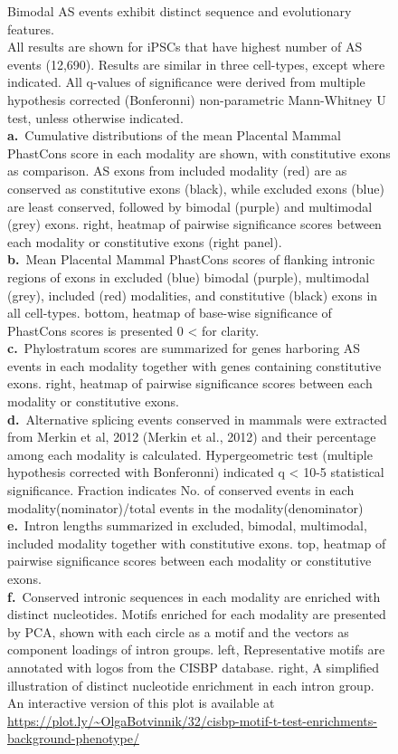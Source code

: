 \clearpage
\thispagestyle{facingcaption}
\begin{figure}[h]
\captionsetup{labelformat=prev-page}
\caption[Bimodal AS events exhibit distinct sequence and evolutionary features.]{
Bimodal AS events exhibit distinct sequence and evolutionary features.\\
All results are shown for iPSCs that have highest number of AS events (12,690). Results are similar in three cell-types, except where indicated. All q-values of significance were derived from multiple hypothesis corrected (Bonferonni) non-parametric Mann-Whitney U test, unless otherwise indicated.\\
\textbf{a.}~Cumulative distributions of the mean Placental Mammal PhastCons score in each modality are shown, with constitutive exons as comparison. AS exons from included modality (red) are as conserved as constitutive exons (black), while excluded exons (blue) are least conserved, followed by bimodal (purple) and multimodal (grey) exons. right, heatmap of pairwise significance scores between each modality or constitutive exons (right panel).\\
\textbf{b.}~Mean Placental Mammal PhastCons scores of flanking intronic regions of exons in excluded (blue) bimodal (purple), multimodal (grey), included (red) modalities, and constitutive (black) exons in all cell-types. bottom, heatmap of base-wise significance of PhastCons scores is presented 0 <  for clarity.\\
\textbf{c.}~Phylostratum scores are summarized for genes harboring AS events in each modality together with genes containing constitutive exons. right, heatmap of pairwise significance scores between each modality or constitutive exons.\\
\textbf{d.}~Alternative splicing events conserved in mammals were extracted from Merkin et al, 2012 (Merkin et al., 2012) and their percentage among each modality is calculated. Hypergeometric test (multiple hypothesis corrected with Bonferonni) indicated q < 10-5 statistical significance. Fraction indicates No. of conserved events in each modality(nominator)/total events in the modality(denominator)\\
\textbf{e.}~Intron lengths summarized in excluded, bimodal, multimodal, included modality together with constitutive exons. top, heatmap of pairwise significance scores between each modality or constitutive exons.\\
\textbf{f.}~Conserved intronic sequences in each modality are enriched with distinct nucleotides. Motifs enriched for each modality are presented by PCA, shown with each circle as a motif and the vectors as component loadings of intron groups. left, Representative motifs are annotated with logos from the CISBP database. right, A simplified illustration of distinct nucleotide enrichment in each intron group. An interactive version of this plot is available at \url{https://plot.ly/~OlgaBotvinnik/32/cisbp-motif-t-test-enrichments-background-phenotype/}
}
\label{fig:modality_features}
\end{figure}
